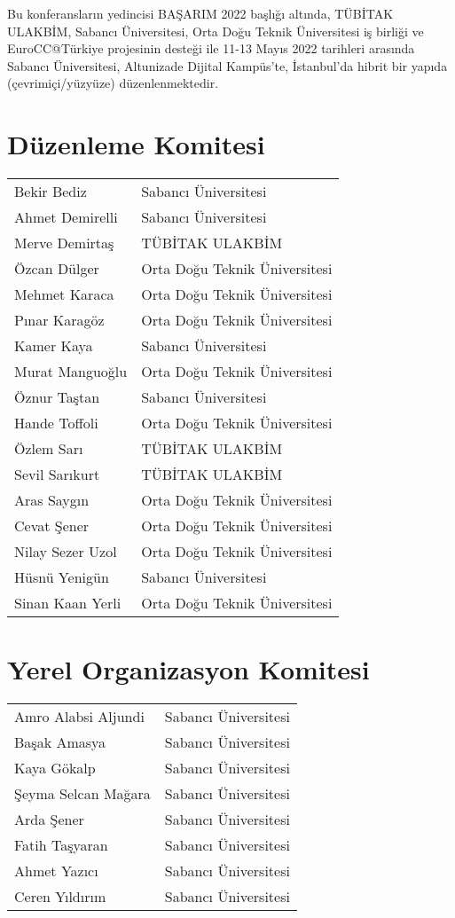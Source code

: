 Bu konferansların yedincisi BAŞARIM 2022 başlığı altında, TÜBİTAK ULAKBİM, Sabancı Üniversitesi, Orta Doğu Teknik Üniversitesi iş birliği
ve EuroCC@Türkiye projesinin desteği ile 11-13 Mayıs 2022 tarihleri arasında Sabancı Üniversitesi, Altunizade Dijital Kampüs'te, İstanbul'da hibrit bir yapıda (çevrimiçi/yüzyüze) düzenlenmektedir. 

\section{Düzenleme Komitesi}
\begin{tabular}{ll}
Bekir Bediz & Sabancı Üniversitesi \\
Ahmet Demirelli & Sabancı Üniversitesi \\
Merve Demirtaş & TÜBİTAK ULAKBİM \\
Özcan Dülger & Orta Doğu Teknik Üniversitesi \\
Mehmet Karaca & Orta Doğu Teknik Üniversitesi \\
Pınar Karagöz & Orta Doğu Teknik Üniversitesi \\
Kamer Kaya & Sabancı Üniversitesi \\
Murat Manguoğlu & Orta Doğu Teknik Üniversitesi \\
Öznur Taştan & Sabancı Üniversitesi \\
Hande Toffoli & Orta Doğu Teknik Üniversitesi \\
Özlem Sarı & TÜBİTAK ULAKBİM \\
Sevil Sarıkurt & TÜBİTAK ULAKBİM \\
Aras Saygın & Orta Doğu Teknik Üniversitesi \\
Cevat Şener & Orta Doğu Teknik Üniversitesi \\ 
Nilay Sezer Uzol & Orta Doğu Teknik Üniversitesi \\
Hüsnü Yenigün & Sabancı Üniversitesi \\
Sinan Kaan Yerli & Orta Doğu Teknik Üniversitesi \\
\end{tabular}

\section{Yerel Organizasyon Komitesi}
\begin{tabular}{ll}
Amro Alabsi Aljundi & Sabancı Üniversitesi \\
Başak Amasya & Sabancı Üniversitesi \\
Kaya Gökalp & Sabancı Üniversitesi \\
Şeyma Selcan Mağara & Sabancı Üniversitesi \\
Arda Şener & Sabancı Üniversitesi \\
Fatih Taşyaran & Sabancı Üniversitesi \\
Ahmet Yazıcı & Sabancı Üniversitesi \\
Ceren Yıldırım & Sabancı Üniversitesi
\end{tabular}

